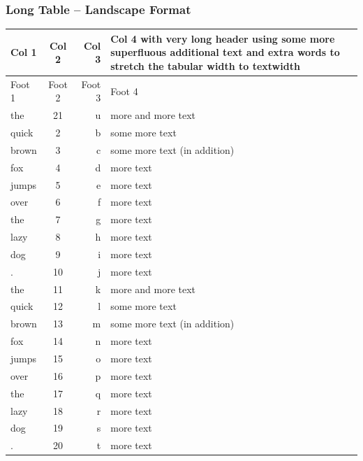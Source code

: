 \subsubsection{Long Table -- Landscape Format}
\label{tab:longtableLandscape}
\begin{tabularx}{\textwidth}{lcrX}
   \toprule
   \textbf{Col 1} &  \textbf{Col 2} &  \textbf{Col 3} & \textbf{Col 4 with very long header using some more
      superfluous additional text and extra words to stretch the tabular width to textwidth} \\
   \midrule\endhead
   \midrule
   Foot 1 & Foot 2 & Foot 3 & Foot 4 \\\bottomrule\endfoot
   the   & 21    & u     & more and more text \\ \midrule
   quick & 2     & b     & some more text \\ \midrule
   brown & 3     & c     & some more text (in addition) \\ \midrule
   fox   & 4     & d     & more text \\ \midrule
   jumps & 5     & e     & more text \\ \midrule
   over  & 6     & f     & more text \\ \midrule
   the   & 7     & g     & more text \\ \midrule
   lazy  & 8     & h     & more text \\ \midrule
   dog   & 9     & i     & more text \\ \midrule
   .     & 10    & j     & more text \\ \midrule
   the   & 11    & k     & more and more text \\ \midrule
   quick & 12    & l     & some more text \\ \midrule
   brown & 13    & m     & some more text (in addition) \\ \midrule
   fox   & 14    & n     & more text \\ \midrule
   jumps & 15    & o     & more text \\ \midrule
   over  & 16    & p     & more text \\ \midrule
   the   & 17    & q     & more text \\ \midrule
   lazy  & 18    & r     & more text \\ \midrule
   dog   & 19    & s     & more text \\ \midrule
   .     & 20    & t     & more text \\ \midrule

\end{tabularx}
